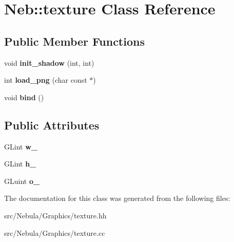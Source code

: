 \hypertarget{classNeb_1_1texture}{\section{\-Neb\-:\-:texture \-Class \-Reference}
\label{classNeb_1_1texture}
}
\subsection*{\-Public \-Member \-Functions}
\begin{DoxyCompactItemize}
\item 
\hypertarget{classNeb_1_1texture_a8d6a7a7332cf05a9ff3509b67a9a3a7d}{void {\bfseries init\-\_\-shadow} (int, int)}\label{classNeb_1_1texture_a8d6a7a7332cf05a9ff3509b67a9a3a7d}

\item 
\hypertarget{classNeb_1_1texture_a39629a65ae9946daf7ed8659feca3ed9}{int {\bfseries load\-\_\-png} (char const $\ast$)}\label{classNeb_1_1texture_a39629a65ae9946daf7ed8659feca3ed9}

\item 
\hypertarget{classNeb_1_1texture_ac5e8baf87aef739ebcc9e4c81e6d1c98}{void {\bfseries bind} ()}\label{classNeb_1_1texture_ac5e8baf87aef739ebcc9e4c81e6d1c98}

\end{DoxyCompactItemize}
\subsection*{\-Public \-Attributes}
\begin{DoxyCompactItemize}
\item 
\hypertarget{classNeb_1_1texture_a5906c4fa0e792b2248962d2dd06508d7}{\-G\-Lint {\bfseries w\-\_\-}}\label{classNeb_1_1texture_a5906c4fa0e792b2248962d2dd06508d7}

\item 
\hypertarget{classNeb_1_1texture_ad7caf7e0f403d4e13fde5bd19761dd8a}{\-G\-Lint {\bfseries h\-\_\-}}\label{classNeb_1_1texture_ad7caf7e0f403d4e13fde5bd19761dd8a}

\item 
\hypertarget{classNeb_1_1texture_a200e3dfdfa5616cba3ef97b63cbe3a54}{\-G\-Luint {\bfseries o\-\_\-}}\label{classNeb_1_1texture_a200e3dfdfa5616cba3ef97b63cbe3a54}

\end{DoxyCompactItemize}


\-The documentation for this class was generated from the following files\-:\begin{DoxyCompactItemize}
\item 
src/\-Nebula/\-Graphics/texture.\-hh\item 
src/\-Nebula/\-Graphics/texture.\-cc\end{DoxyCompactItemize}
